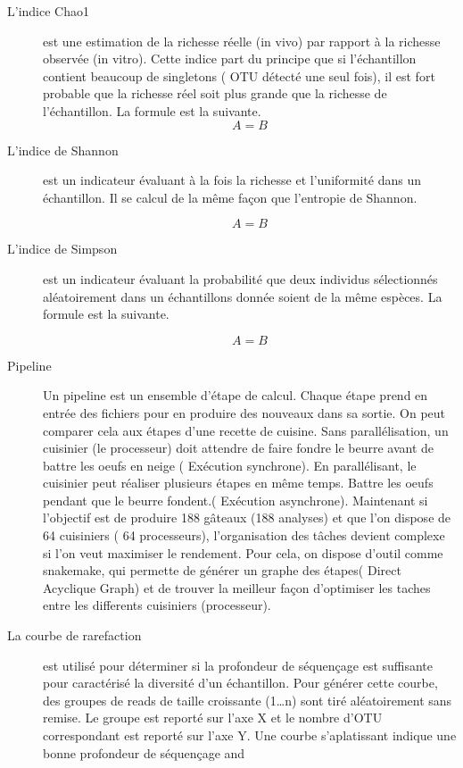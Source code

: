 \documentclass[12pt,a4paper]{article}
\begin{document}
\begin{description}
\item[L'indice Chao1] est une estimation de la richesse réelle (in vivo) par rapport à la richesse observée (in vitro). Cette indice part du principe que si l’échantillon contient beaucoup de singletons ( OTU détecté une seul fois), il est fort probable que la richesse réel soit plus grande que la richesse de l’échantillon. La formule est la suivante.
\begin{equation}
A = B
\end{equation}

\item[L'indice de Shannon] est un indicateur évaluant à la fois la richesse et l’uniformité dans un échantillon. Il se calcul de la même façon que l’entropie de Shannon.

\begin{equation}
A = B
\end{equation}

\item[L'indice de Simpson] est un indicateur évaluant la probabilité que deux individus sélectionnés aléatoirement dans un échantillons donnée soient de la même espèces. La formule est la suivante.

\begin{equation}
A = B
\end{equation}

\item[Pipeline] 
Un pipeline est un ensemble d'étape de calcul. Chaque étape prend en entrée des fichiers pour en produire des nouveaux dans sa sortie. On peut comparer cela aux étapes d'une recette de cuisine. Sans parallélisation, un cuisinier (le processeur) doit attendre de faire fondre le beurre avant de battre les oeufs en neige ( Exécution synchrone). En parallélisant, le cuisinier peut réaliser plusieurs étapes en même temps. Battre les oeufs pendant que le beurre fondent.( Exécution asynchrone). 
Maintenant si l'objectif est de produire 188 gâteaux (188 analyses) et que l'on dispose de 64 cuisiniers ( 64 processeurs), l'organisation des tâches devient complexe si l'on veut maximiser le rendement. Pour cela, on dispose d'outil comme snakemake, qui permette de générer un graphe des étapes( Direct Acyclique Graph) et de trouver la meilleur façon d'optimiser les taches entre les differents cuisiniers (processeur). 


\item[La courbe de rarefaction] est utilisé pour déterminer si la profondeur de séquençage est suffisante pour caractérisé la diversité d’un échantillon.
Pour générer cette courbe, des groupes de reads de taille croissante (1…n) sont tiré aléatoirement sans remise. Le groupe est reporté sur l'axe X et le nombre d’OTU correspondant est reporté sur l’axe Y.
Une courbe s’aplatissant indique une bonne profondeur de séquençage \citep{Dickson2014} and \citep{Beck}

\end{description}
\end{document}

